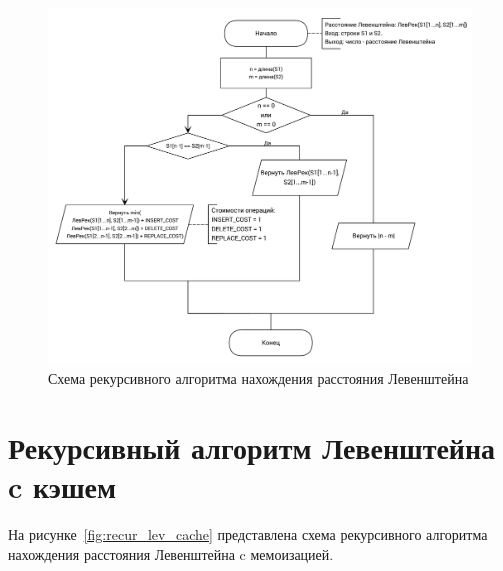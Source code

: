 \begin{figure}[H]
\centering
\includegraphics[width=\textwidth]{inc/img/recursive_levenshtein.pdf}
\caption{Схема рекурсивного алгоритма нахождения расстояния \newline Левенштейна}
\label{fig:recur_lev}
\end{figure}

\section{Рекурсивный алгоритм Левенштейна c кэшем}

На рисунке~\ref{fig:recur_lev_cache} представлена схема рекурсивного алгоритма нахождения расстояния Левенштейна c мемоизацией.

